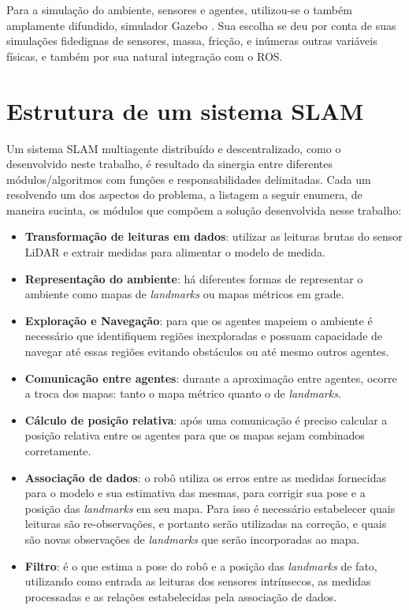Para a simulação do ambiente, sensores e agentes, utilizou-se o também 
amplamente difundido, simulador Gazebo \cite{Koenig-2004-394}. Sua escolha 
se deu por conta de suas simulações fidedignas de sensores, massa, fricção, 
e inúmeras outras variáveis físicas, e também por sua natural integração 
com o ROS.


\section{Estrutura de um sistema SLAM}
Um sistema SLAM multiagente distribuído e descentralizado, como o 
desenvolvido neste trabalho, é resultado da sinergia entre diferentes 
módulos/algoritmos com funções e responsabilidades delimitadas. Cada um 
resolvendo um dos aspectos do problema, a listagem a seguir enumera, de 
maneira sucinta, os módulos que compõem a solução desenvolvida nesse trabalho: 
\begin{itemize}
  \item \textbf{Transformação de leituras em dados}: utilizar as leituras 
  brutas do sensor LiDAR e extrair medidas para alimentar o modelo de medida.
  \item \textbf{Representação do ambiente}: há diferentes formas de 
  representar o ambiente como mapas de \textit{landmarks} ou mapas 
  métricos em grade.
  \item \textbf{Exploração e Navegação}: para que os agentes mapeiem o 
  ambiente é necessário que identifiquem regiões inexploradas e possuam 
  capacidade de navegar até essas regiões evitando obstáculos ou até 
  mesmo outros agentes.
  \item \textbf{Comunicação entre agentes}: durante a aproximação entre 
  agentes, ocorre a troca dos mapas: tanto o mapa métrico quanto o de 
  \textit{landmarks}.
  \item \textbf{Cálculo de posição relativa}: após uma comunicação é 
  preciso calcular a posição relativa entre os agentes para que os mapas 
  sejam combinados corretamente.
  \item \textbf{Associação de dados}: o robô utiliza os erros entre as 
  medidas fornecidas para o modelo e sua estimativa das mesmas, para 
  corrigir sua pose e a posição das \textit{landmarks} em seu mapa. 
  Para isso é necessário estabelecer quais leituras são 
  re-observações, e portanto serão utilizadas na correção, e quais são 
  novas observações de \textit{landmarks} que serão incorporadas ao mapa.
  \item \textbf{Filtro}: é o que estima a pose do robô e a posição das \textit{landmarks} de fato, utilizando como entrada as leituras dos 
  sensores intrínsecos, as medidas processadas e as relações 
  estabelecidas pela associação de dados.
\end{itemize}



